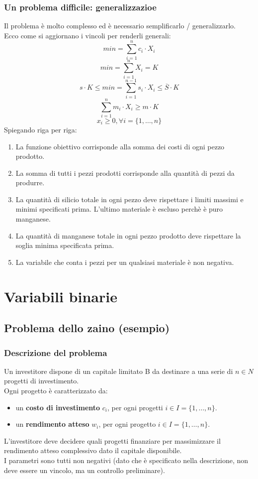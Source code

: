 \documentclass[12pt,a4paper]{article}
\let\oldsection\section
\renewcommand{\section}{\clearpage\oldsection}
\begin{document}
\subsubsection{Un problema difficile: generalizzazioe}
Il problema è molto complesso ed è necessario semplificarlo / generalizzarlo.\\
Ecco come si aggiornano i vincoli per renderli generali:
\[
min = \sum_{i = 1}^{n} c_i \cdot X_i
\]
\[
min = \sum_{i = 1}^{n} X_i = K
\]
\[
s \cdot K \leq min = \sum_{i = 1}^{n - 1} s_i \cdot X_i \leq \overline{S} \cdot K
\]
\[
\sum_{i = 1}^{n} m_i \cdot X_i \geq m \cdot K
\]
\[
x_i \geq 0, \forall i = \{1,\ldots,n\}
\]
Spiegando riga per riga:
\begin{enumerate}
    \item La funzione obiettivo corrisponde alla somma dei costi di ogni pezzo prodotto.
    \item La somma di tutti i pezzi prodotti corrisponde alla quantità di pezzi da produrre.
    \item La quantità di silicio totale in ogni pezzo deve rispettare i limiti massimi e minimi specificati prima. L'ultimo materiale è escluso perchè è puro manganese.
    \item La quantità di manganese totale in ogni pezzo prodotto deve rispettare la soglia minima specificata prima.
    \item La variabile che conta i pezzi per un qualsiasi materiale è non negativa.
\end{enumerate}


\section{Variabili binarie}
\subsection{Problema dello zaino (esempio)}
\subsubsection{Descrizione del problema}
Un investitore dispone di un capitale limitato B da destinare a una serie di $n \in N$ progetti di investimento.\\
Ogni progetto è caratterizzato da:
\begin{itemize}
    \item un \textbf{costo di investimento} $c_i$, per ogni progetti $i \in I = \{1,\ldots,n\}$.
    \item un \textbf{rendimento atteso} $w_i$, per ogni progetto $i \in I = \{1,\ldots,n\}$.
\end{itemize}
L'investitore deve decidere quali progetti finanziare per massimizzare il rendimento atteso complessivo dato il capitale disponibile.\\
I parametri sono tutti non negativi (dato che è specificato nella descrizione, non deve essere un vincolo, ma un controllo preliminare).
\end{document}
